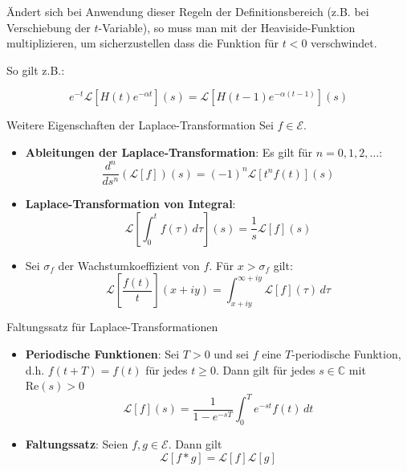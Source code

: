 \documentclass[a4paper,10pt]{article}
\def\Re{\text{Re}}
\begin{document}
Ändert sich bei Anwendung dieser Regeln der Definitionsbereich (z.B. bei Verschiebung der $t$-Variable), so muss man mit der Heaviside-Funktion multiplizieren, um sicherzustellen dass die Funktion für $t < 0$ verschwindet.

So gilt z.B.:

$$
e^{-t} \mathcal{L}[H(t) e^{-\alpha t}](s) = \mathcal{L}[H(t - 1) e^{-\alpha(t-1)}](s)
$$

\begin{mainbox}{Weitere Eigenschaften der Laplace-Transformation}
  Sei \(f\in\mathcal{E}\).
  \begin{itemize}
    \item{
      \textbf{Ableitungen der Laplace-Transformation}: Es gilt für \(n=0,1,2,\dots\):
       \begin{equation*} \frac{d^n}{ds^n}(\mathcal{L}[f])(s)=(-1)^n\mathcal{L}[t^nf(t)](s) \end{equation*}
    }

    \item{
      \textbf{Laplace-Transformation von Integral}:
      \begin{equation*} \mathcal{L}\left[\int_0^t f(\tau)\,d\tau\right](s)=\frac{1}{s}\mathcal{L}[f](s) \end{equation*}
    }

    \item{
      Sei \(\sigma_f\) der Wachstumkoeffizient von \(f\). Für \(x>\sigma_f\) gilt: \begin{equation*} \mathcal{L}\left[\frac{f(t)}{t}\right](x+ i y)=\int_{x+ i y}^{\infty+ i y} \mathcal{L}[f](\tau)\,d\tau \end{equation*}
    }
  \end{itemize}
\end{mainbox}

\begin{mainbox}{Faltungssatz für Laplace-Transformationen}
  \begin{itemize}
    \item{
      \textbf{Periodische Funktionen}: Sei \(T>0\) und sei \(f\) eine \(T\)-periodische Funktion, d.h. \(f(t+T)=f(t)\) für jedes \(t\geq0\). Dann gilt für jedes \(s\in\mathbb{C}\) mit \(\Re(s)>0\) \begin{equation*} \mathcal{L}[f](s)=\frac{1}{1-e^{-sT}}\int_0^Te^{-st}f(t)\,dt \end{equation*}
    }
    \item{
      \textbf{Faltungssatz}: Seien \(f,g\in\mathcal{E}\). Dann gilt \begin{equation*} \mathcal{L}[f*g]=\mathcal{L}[f]\mathcal{L}[g] \end{equation*}
    }
  \end{itemize}
\end{mainbox}
\end{document}
